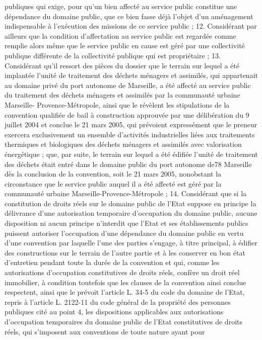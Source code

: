 \documentclass[11pt,a4paper]{report}
\begin{document}
publiques qui exige, pour qu'un bien affecté au service public constitue une dépendance du domaine public, que
ce bien fasse déjà l'objet d'un aménagement indispensable à l'exécution des missions de ce service public ;
12. Considérant par ailleurs que la condition d'affectation au service public est regardée comme remplie alors
même que le service public en cause est géré par une collectivité publique différente de la collectivité publique
qui est propriétaire ;
13. Considérant qu'il ressort des pièces du dossier que le terrain sur lequel a été implantée l'unité de traitement
des déchets ménagers et assimilés, qui appartenait au domaine privé du port autonome de Marseille, a été
affecté au service public du traitement des déchets ménagers et assimilés par la communauté urbaine Marseille-
Provence-Métropole, ainsi que le révèlent les stipulations de la convention qualifiée de bail à construction
approuvée par une délibération du 9 juillet 2004 et conclue le 21 mars 2005, qui prévoient expressément que le
preneur exercera exclusivement un ensemble d'activités industrielles liées aux traitements thermiques et
biologiques des déchets ménagers et assimilés avec valorisation énergétique ; que, par suite, le terrain sur
lequel a été édifiée l'unité de traitement des déchets était entré dans le domaine public du port autonome de78
Marseille dès la conclusion de la convention, soit le 21 mars 2005, nonobstant la circonstance que le service
public auquel il a été affecté est géré par la communauté urbaine Marseille-Provence-Métropole ;
14. Considérant que si la constitution de droits réels sur le domaine public de l'Etat suppose en principe la
délivrance d'une autorisation temporaire d'occupation du domaine public, aucune disposition ni aucun principe
n'interdit que l'Etat et ses établissements publics puissent autoriser l'occupation d'une dépendance du domaine
public en vertu d'une convention par laquelle l'une des parties s'engage, à titre principal, à édifier des
constructions sur le terrain de l'autre partie et à les conserver en bon état d'entretien pendant toute la durée de
la convention et qui, comme les autorisations d'occupation constitutives de droits réels, confère un droit réel
immobilier, à condition toutefois que les clauses de la convention ainsi conclue respectent, ainsi que le prévoit
l'article L. 34-5 du code du domaine de l'Etat, repris à l'article L. 2122-11 du code général de la propriété des
personnes publiques cité au point 4, les dispositions applicables aux autorisations d'occupation temporaires du
domaine public de l'Etat constitutives de droits réels, qui s'imposent aux conventions de toute nature ayant pour
\end{document}

